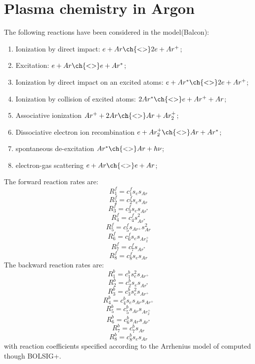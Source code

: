 \documentclass[11pt]{amsart}
\begin{document}
\section{Plasma chemistry in Argon}
The following reactions have been considered in the model(Balcon):
\begin{enumerate}
    \item Ionization by direct impact: $e + Ar \ch{<>} 2e + Ar^+$;
    \item Excitation: $e + Ar \ch{<>} e + Ar^*$;
    \item Ionization by direct impact on an excited atoms: $e + Ar^* \ch{<>} 2e + Ar^+$; 
    \item Ionization by collision of excited atoms: $2Ar^* \ch{<>} e + Ar^+ + Ar $;
    \item Associative ionization $Ar^+ + 2Ar \ch{<>} Ar + Ar_2^+$;
    \item Dissociative electron ion recombination $e + Ar_2^+ \ch{<>} Ar + Ar^*$;
    \item spontaneous de-excitation $Ar^* \ch{<>} Ar +h\nu$;
    \item electron-gas scattering $e + Ar \ch{<>} e + Ar$;
\end{enumerate}

The forward reaction rates are:
$$
R_1^f=c_1^f s_es_{Ar}
$$
$$
R_2^f=c_2^f s_es_{Ar}
$$
$$
R_3^f=c_3^f s_es_{Ar^*}
$$
$$
R_4^f=c_4^f s_{Ar^*}^2
$$
$$
R_5^f=c_5^f s_{Ar^+}s_{Ar}^2
$$
$$
R_6^f=c_6^f s_{e}s_{Ar_2^+}
$$
$$
R_7^f=c_7^f s_{Ar^*}
$$
$$
R_8^f=c_8^f s_es_{Ar}
$$
The backward reaction rates are:
$$
R_1^b=c_1^b s_e^2s_{Ar^+}
$$
$$
R_2^b=c_2^b s_es_{Ar^*}
$$
$$
R_3^b=c_3^b s_e^2s_{Ar^+}
$$
$$
R_4^b=c_4^b  s_es_{Ar}s_{Ar^+}
$$
$$
R_5^b=c_5^b s_{Ar}s_{Ar_2^+}
$$
$$
R_6^b=c_6^b s_{Ar}s_{Ar^*}
$$
$$
R_7^b=c_7^b s_{Ar}
$$
$$
R_8^b=c_8^b s_es_{Ar}
$$
with reaction coefficients specified according to the Arrhenius model of computed though BOLSIG+.
\end{document}
